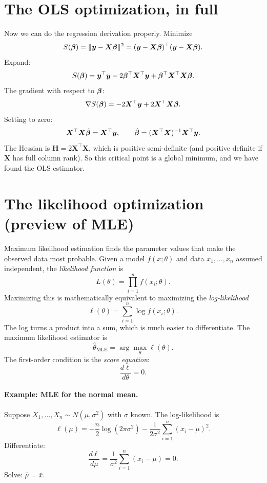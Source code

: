 \section{The OLS optimization, in full}

Now we can do the regression derivation properly. Minimize
\[
  S(\bm{\beta}) = \|\bm{y} - \bm{X}\bm{\beta}\|^2 = (\bm{y} - \bm{X}\bm{\beta})^\top(\bm{y} - \bm{X}\bm{\beta}).
\]
Expand:
\[
  S(\bm{\beta}) = \bm{y}^\top \bm{y} - 2\bm{\beta}^\top \bm{X}^\top \bm{y} + \bm{\beta}^\top \bm{X}^\top \bm{X} \bm{\beta}.
\]
The gradient with respect to $\bm{\beta}$:
\[
  \nabla S(\bm{\beta}) = -2 \bm{X}^\top \bm{y} + 2 \bm{X}^\top \bm{X} \bm{\beta}.
\]
Setting to zero:
\[
  \bm{X}^\top \bm{X} \hat{\bm{\beta}} = \bm{X}^\top \bm{y}, \qquad \hat{\bm{\beta}} = (\bm{X}^\top \bm{X})^{-1} \bm{X}^\top \bm{y}.
\]
The Hessian is $\bm{H} = 2\bm{X}^\top \bm{X}$, which is positive semi-definite (and positive definite if $\bm{X}$ has full column rank). So this critical point is a global minimum, and we have found the OLS estimator.

\section{The likelihood optimization (preview of MLE)}

Maximum likelihood estimation finds the parameter values that make the observed data most probable. Given a model $f(x; \theta)$ and data $x_1, \ldots, x_n$ assumed independent, the \emph{likelihood function} is
\begin{equation}
  L(\theta) = \prod_{i=1}^{n} f(x_i; \theta).
  \label{eq:likelihood}
\end{equation}
Maximizing this is mathematically equivalent to maximizing the \emph{log-likelihood}
\begin{equation}
  \ell(\theta) = \sum_{i=1}^{n} \log f(x_i; \theta).
  \label{eq:log-likelihood}
\end{equation}
The log turns a product into a sum, which is much easier to differentiate. The maximum likelihood estimator is
\[
  \hat\theta_{\text{MLE}} = \arg\max_\theta \ell(\theta).
\]
The first-order condition is the \emph{score equation}:
\[
  \frac{d\ell}{d\theta} = 0.
\]

\paragraph{Example: MLE for the normal mean.} Suppose $X_1, \ldots, X_n \sim N(\mu, \sigma^2)$ with $\sigma$ known. The log-likelihood is
\[
  \ell(\mu) = -\frac{n}{2}\log(2\pi\sigma^2) - \frac{1}{2\sigma^2}\sum_{i=1}^{n}(x_i - \mu)^2.
\]
Differentiate:
\[
  \frac{d\ell}{d\mu} = \frac{1}{\sigma^2}\sum_{i=1}^{n}(x_i - \mu) = 0.
\]
Solve: $\hat\mu = \bar{x}$.

